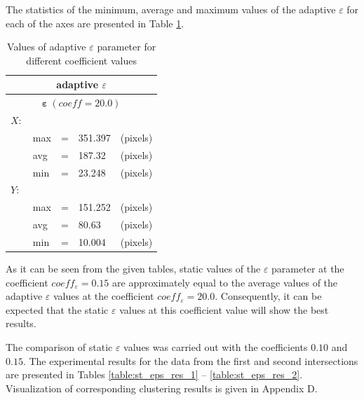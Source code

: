 The statistics of the minimum, average and maximum values of the adaptive $\varepsilon$ for each of the axes are presented in Table \ref{table:eps_adapt}.

\begin{table}[!htb]
	\caption{Values of adaptive $\varepsilon$ parameter for different coefficient values}
	\label{table:eps_adapt}
	
	\setlength{\tabcolsep}{10pt}
	\centering
	
	\begin{tabular}{||lllll||}
		\multicolumn{5}{c}{adaptive $\varepsilon$} \\
		\hline
		\multicolumn{5}{||c||}{$\bm{\varepsilon}\ (coeff = 20.0)$}\\
		$X:$       			& & & & \\[0.5ex]
		& max 	& = 	& 351.397 	& (pixels) \\[0.5ex]
		& avg 	& = 	& 187.32 	& (pixels) \\[0.5ex]
		& min 	& = 	& 23.248 	& (pixels) \\[0.5ex]
		$Y:$       			& & & & \\[0.5ex]
		& max 	& = 	& 151.252 	& (pixels) \\[0.5ex]
		& avg 	& = 	& 80.63 	& (pixels) \\[0.5ex]
		& min 	& = 	& 10.004 	& (pixels) \\[0.5ex]
		\hline
	\end{tabular}
\end{table}

As it can be seen from the given tables, static values of the $\varepsilon$ parameter at the coefficient $coeff_\varepsilon = 0.15$ are approximately equal to the average values of the adaptive $\varepsilon$ values at the coefficient $coeff_\varepsilon = 20.0$. Consequently, it can be expected that the static $\varepsilon$ values ​​at this coefficient value will show the best results.

The comparison of static $\varepsilon$ values was carried out with the coefficients $0.10$ and $0.15$. The experimental results for the data from the first and second intersections are presented in Tables \ref{table:st_eps_res_1} -- \ref{table:st_eps_res_2}. Visualization of corresponding clustering results is given in Appendix D.

